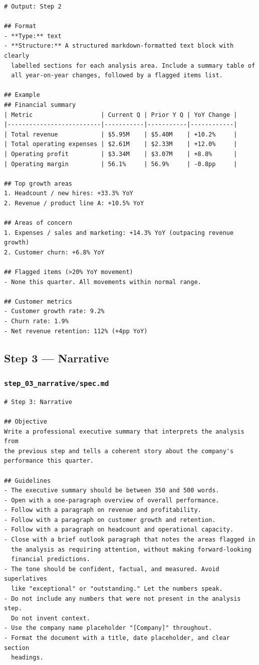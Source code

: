 \documentclass[12pt, a4paper]{article}
\begin{document}
\begin{lstlisting}[language={}]
# Output: Step 2

## Format
- **Type:** text
- **Structure:** A structured markdown-formatted text block with clearly
  labelled sections for each analysis area. Include a summary table of
  all year-on-year changes, followed by a flagged items list.

## Example
## Financial summary
| Metric                   | Current Q | Prior Y Q | YoY Change |
|--------------------------|-----------|-----------|------------|
| Total revenue            | $5.95M    | $5.40M    | +10.2%     |
| Total operating expenses | $2.61M    | $2.33M    | +12.0%     |
| Operating profit         | $3.34M    | $3.07M    | +8.8%      |
| Operating margin         | 56.1%     | 56.9%     | -0.8pp     |

## Top growth areas
1. Headcount / new hires: +33.3% YoY
2. Revenue / product line A: +10.5% YoY

## Areas of concern
1. Expenses / sales and marketing: +14.3% YoY (outpacing revenue growth)
2. Customer churn: +6.8% YoY

## Flagged items (>20% YoY movement)
- None this quarter. All movements within normal range.

## Customer metrics
- Customer growth rate: 9.2%
- Churn rate: 1.9%
- Net revenue retention: 112% (+4pp YoY)
\end{lstlisting}

\subsection{Step 3 --- Narrative}

\subsubsection{\texttt{step\_03\_narrative/spec.md}}

\begin{lstlisting}[language={}]
# Step 3: Narrative

## Objective
Write a professional executive summary that interprets the analysis from
the previous step and tells a coherent story about the company's
performance this quarter.

## Guidelines
- The executive summary should be between 350 and 500 words.
- Open with a one-paragraph overview of overall performance.
- Follow with a paragraph on revenue and profitability.
- Follow with a paragraph on customer growth and retention.
- Follow with a paragraph on headcount and operational capacity.
- Close with a brief outlook paragraph that notes the areas flagged in
  the analysis as requiring attention, without making forward-looking
  financial predictions.
- The tone should be confident, factual, and measured. Avoid superlatives
  like "exceptional" or "outstanding." Let the numbers speak.
- Do not include any numbers that were not present in the analysis step.
  Do not invent context.
- Use the company name placeholder "[Company]" throughout.
- Format the document with a title, date placeholder, and clear section
  headings.
\end{lstlisting}
\end{document}
